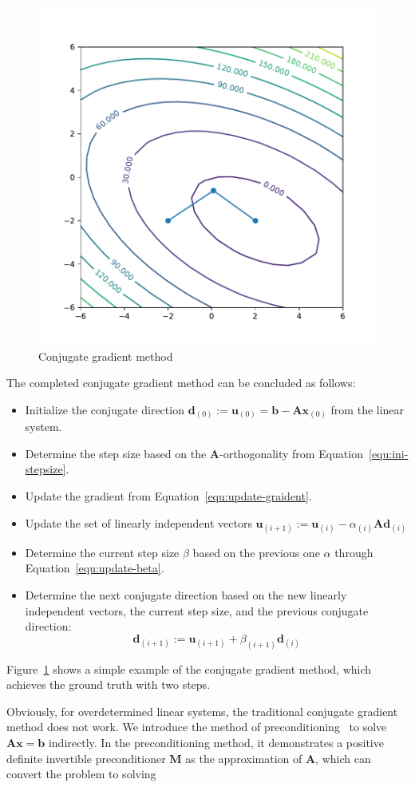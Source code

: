 \begin{figure}[t]
    \label{fig:conj-gradient}
    \centering
    \includegraphics[page=1, width=.6\textwidth]{figs/conjugate-gradient.pdf}
    \caption{Conjugate gradient method}
\end{figure}
\par The completed conjugate gradient method can be concluded as follows:
\begin{itemize}
    \item Initialize the conjugate direction $\mathbf{d}_{(0)}:=\mathbf{u}_{(0)}=\mathbf{b}-\mathbf{A} \mathbf{x}_{(0)}$ from the linear system.
    \item Determine the step size based on the $\mathbf{A}$-orthogonality from Equation~\ref{equ:ini-stepsize}.
    \item Update the gradient from Equation~\ref{equ:update-graident}.
    \item Update the set of linearly independent vectors $\mathbf{u}_{(i+1)}:=\mathbf{u}_{(i)}-\alpha_{(i)} \mathbf{A} \mathbf{d}_{(i)}$
    \item Determine the current step size $\beta$ based on the previous one $\alpha$ through Equation~\ref{equ:update-beta}. 
    \item Determine the next conjugate direction based on the new linearly independent vectors, the current step size, and the previous conjugate direction:
    $$
    \mathbf{d}_{(i+1)}:=\mathbf{u}_{(i+1)}+\beta_{(i+1)} \mathbf{d}_{(i)}
    $$
\end{itemize}
\par Figure~\ref{fig:conj-gradient} shows a simple example of the conjugate gradient method, which achieves the ground truth with two steps. 
\par Obviously, for overdetermined linear systems, the traditional conjugate gradient method does not work. We introduce the method of preconditioning~\citep{SJ:94} to solve $\mathbf{A}\mathbf{x}=\mathbf{b}$ indirectly. In the preconditioning method, it demonstrates a positive definite invertible preconditioner $\mathbf{M}$ as the approximation of $\mathbf{A}$, which can convert the problem to solving 

